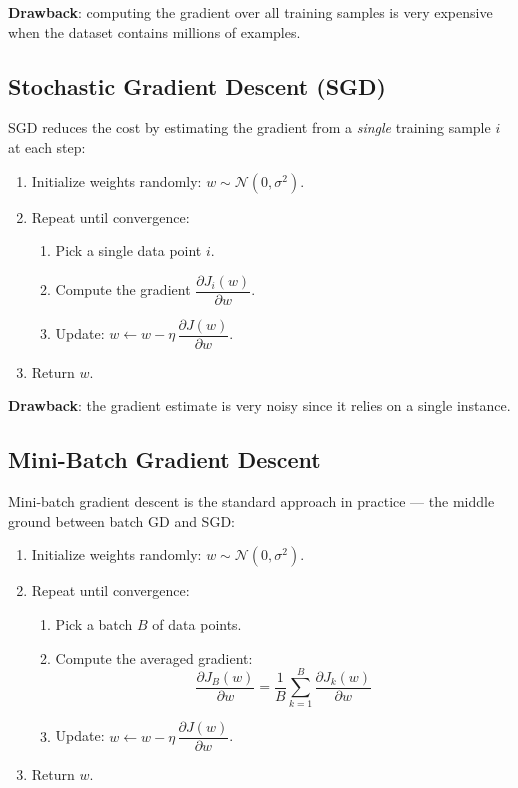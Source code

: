 \documentclass[11pt,a4paper]{article}
\theoremstyle{definition}
\theoremstyle{plain}
\theoremstyle{remark}
\begin{document}
\textbf{Drawback}: computing the gradient over all training samples is very expensive when the dataset contains millions of examples.

\subsection{Stochastic Gradient Descent (SGD)}

SGD reduces the cost by estimating the gradient from a \textit{single} training sample $i$ at each step:
\begin{enumerate}
    \item Initialize weights randomly: $w \sim \mathcal{N}(0, \sigma^2)$.
    \item Repeat until convergence:
    \begin{enumerate}
        \item Pick a single data point $i$.
        \item Compute the gradient $\dfrac{\partial J_i(w)}{\partial w}$.
        \item Update: $w \leftarrow w - \eta\,\dfrac{\partial J(w)}{\partial w}$.
    \end{enumerate}
    \item Return $w$.
\end{enumerate}

\textbf{Drawback}: the gradient estimate is very noisy since it relies on a single instance.

\subsection{Mini-Batch Gradient Descent}

Mini-batch gradient descent is the standard approach in practice --- the middle ground between batch GD and SGD:
\begin{enumerate}
    \item Initialize weights randomly: $w \sim \mathcal{N}(0, \sigma^2)$.
    \item Repeat until convergence:
    \begin{enumerate}
        \item Pick a batch $B$ of data points.
        \item Compute the averaged gradient:
        \[
            \frac{\partial J_B(w)}{\partial w} = \frac{1}{B}\sum_{k=1}^{B} \frac{\partial J_k(w)}{\partial w}
        \]
        \item Update: $w \leftarrow w - \eta\,\dfrac{\partial J(w)}{\partial w}$.
    \end{enumerate}
    \item Return $w$.
\end{enumerate}
\end{document}
